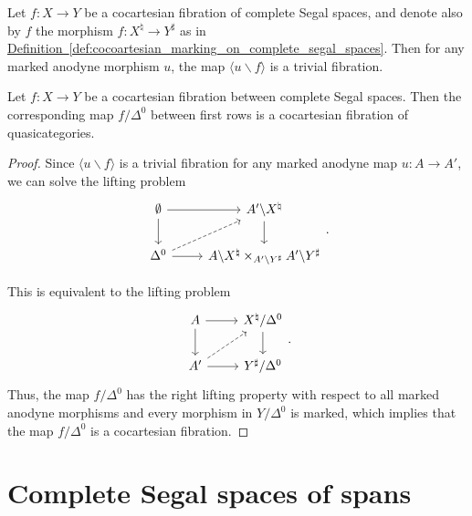 \documentclass[main.tex]{subfiles}
\begin{document}
\begin{theorem}
  \label{thm:divide_by_marked_anodyne}
  Let $f\colon X \to Y$ be a cocartesian fibration of complete Segal spaces, and denote also by $f$ the morphism $f\colon X^{\natural} \to Y^{\sharp}$ as in \hyperref[def:cocoartesian_marking_on_complete_segal_spaces]{Definition~\ref*{def:cocoartesian_marking_on_complete_segal_spaces}}. Then for any marked anodyne morphism $u$, the map $\langle u \backslash f \rangle$ is a trivial fibration.
\end{theorem}

\begin{corollary}
  Let $f\colon X \to Y$ be a cocartesian fibration between complete Segal spaces. Then the corresponding map $f / \Delta^{0}$ between first rows is a cocartesian fibration of quasicategories.
\end{corollary}
\begin{proof}
  Since $\langle u \backslash f \rangle$ is a trivial fibration for any marked anodyne map $u\colon A \to A'$, we can solve the lifting problem
  \begin{equation*}
    \begin{tikzcd}
      \emptyset
      \arrow[r]
      \arrow[d]
      & A' \backslash X^{\natural}
      \arrow[d]
      \\
      \Delta^{0}
      \arrow[r]
      \arrow[ur, dashed]
      & A \backslash X^{\natural} \times_{A' \backslash Y^{\sharp}} A' \backslash Y^{\sharp}
    \end{tikzcd}.
  \end{equation*}

  This is equivalent to the lifting problem
  \begin{equation*}
    \begin{tikzcd}
      A
      \arrow[r]
      \arrow[d]
      & X^{\natural} / \Delta^{0}
      \arrow[d]
      \\
      A'
      \arrow[r]
      \arrow[ur, dashed]
      & Y^{\sharp} / \Delta^{0}
    \end{tikzcd}.
  \end{equation*}
  Thus, the map $f / \Delta^{0}$ has the right lifting property with respect to all marked anodyne morphisms and every morphism in $Y / \Delta^{0}$ is marked, which implies that the map $f / \Delta^{0}$ is a cocartesian fibration.
\end{proof}

\section{Complete Segal spaces of spans}
\label{sec:complete_segal_spaces_of_spans}
\end{document}
